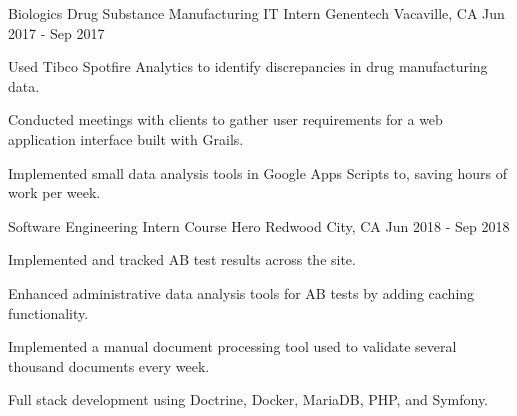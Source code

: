 

\begin{cventries}

  \cventry
  {Biologics Drug Substance Manufacturing IT Intern} %
  {Genentech} %
  {Vacaville, CA} %
  {Jun 2017 - Sep 2017} %
  {
  \begin{cvitems} %
    \item {Used Tibco Spotfire Analytics to identify discrepancies in drug manufacturing data.}
    \item {Conducted meetings with clients to gather user requirements for a web application interface built with Grails.}
    \item {Implemented small data analysis tools in Google Apps Scripts to, saving hours of work per week.}
  \end{cvitems}
  }

  \cventry
  {Software Engineering Intern}
  {Course Hero}
  {Redwood City, CA}
  {Jun 2018 - Sep 2018}
  {
  \begin{cvitems}
    \item {Implemented and tracked AB test results across the site.}
    \item {Enhanced administrative data analysis tools for AB tests by adding caching functionality.}
    \item {Implemented a manual document processing tool used to validate several thousand documents every week.}
    \item {Full stack development using Doctrine, Docker, MariaDB, PHP, and Symfony.}
  \end{cvitems}
  }
\end{cventries}
